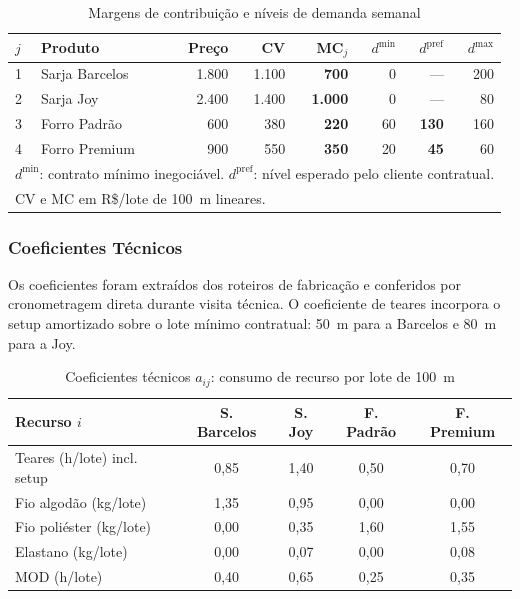 \begin{table}[H]
\centering
\caption{Margens de contribuição e níveis de demanda semanal}
\label{tab:prod_r2}
\begin{tabular}{llrrrrrr}
\toprule
\textbf{$j$} & \textbf{Produto} & \textbf{Preço} & \textbf{CV} & \textbf{MC$_j$} & \textbf{$d^{\min}$} & \textbf{$d^{\text{pref}}$} & \textbf{$d^{\max}$} \\
\midrule
1 & Sarja Barcelos  & 1.800 & 1.100 & \textbf{700}  &   0 & ---  & 200 \\
2 & Sarja Joy       & 2.400 & 1.400 & \textbf{1.000}&   0 & ---  &  80 \\
3 & Forro Padrão    &   600 &   380 & \textbf{220}  &  60 & \textbf{130} & 160 \\
4 & Forro Premium   &   900 &   550 & \textbf{350}  &  20 & \textbf{45}  &  60 \\
\bottomrule
\multicolumn{8}{l}{\footnotesize $d^{\min}$: contrato mínimo inegociável. $d^{\text{pref}}$: nível esperado pelo cliente contratual.}\\
\multicolumn{8}{l}{\footnotesize CV e MC em R\$/lote de 100~m lineares.}
\end{tabular}
\end{table}

\subsubsection{Coeficientes Técnicos}

Os coeficientes foram extraídos dos roteiros de fabricação e conferidos por
cronometragem direta durante visita técnica. O coeficiente de teares incorpora
o setup amortizado sobre o lote mínimo contratual: 50~m para a Barcelos e
80~m para a Joy.

\begin{table}[H]
\centering
\caption{Coeficientes técnicos $a_{ij}$: consumo de recurso por lote de 100~m}
\label{tab:coef_r2}
\renewcommand{\arraystretch}{1.2}
\begin{tabular}{lcccc}
\toprule
\textbf{Recurso $i$} & \textbf{S. Barcelos} & \textbf{S. Joy} & \textbf{F. Padrão} & \textbf{F. Premium} \\
\midrule
Teares (h/lote) incl. setup & 0,85 & 1,40 & 0,50 & 0,70 \\
Fio algodão (kg/lote)       & 1,35 & 0,95 & 0,00 & 0,00 \\
Fio poliéster (kg/lote)     & 0,00 & 0,35 & 1,60 & 1,55 \\
Elastano (kg/lote)          & 0,00 & 0,07 & 0,00 & 0,08 \\
MOD (h/lote)                & 0,40 & 0,65 & 0,25 & 0,35 \\
\bottomrule
\end{tabular}
\end{table}

